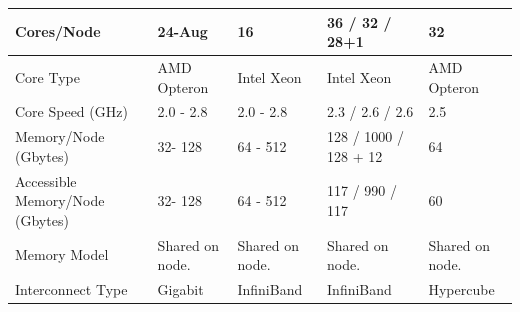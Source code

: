 \documentclass[gmd, manuscript]{copernicus}
\begin{document}
\begin{table}[]
\begin{tabular}{|l|l|l|l|l|}
  Cores/Node                      & 24-Aug                                     & 16                                           & 36 / 32 / 28+1                                                                                                   & 32                                         \\ \hline
  Core Type                       & AMD Opteron                                & Intel Xeon                                   & Intel Xeon                                                                                               & AMD Opteron                                \\ \hline
  Core Speed (GHz)                & 2.0 - 2.8                                  & 2.0 - 2.8                                    & 2.3 / 2.6 / 2.6                                                                                                  & 2.5                                        \\ \hline
  Memory/Node (Gbytes)            & 32- 128                                    & 64 - 512                                     & 128 / 1000 / 128 + 12                                                                                            & 64                                         \\ \hline
  Accessible Memory/Node (Gbytes) & 32- 128                                    & 64 - 512                                     & 117 / 990 / 117                                                                                                  & 60                                         \\ \hline
  Memory Model                    & Shared on node.                            & Shared on node.                              & Shared on node.                                                                                                  & Shared on node.                            \\ \hline
  Interconnect Type               & Gigabit                                    & InfiniBand                                   & InfiniBand                                                                                              & Hypercube                                  \\ \hline
  \end{tabular}
\end{table}
\end{document}
